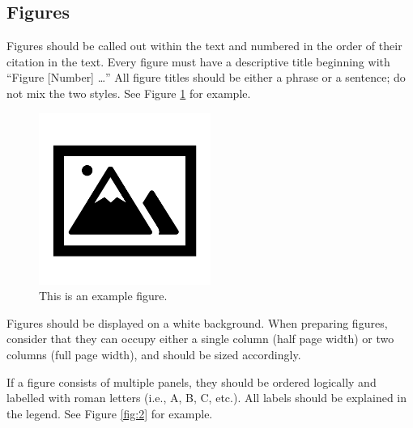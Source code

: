 \documentclass{article}
\begin{document}
\subsection*{Figures}
Figures should be called out within the text and numbered in the order of their citation in the text. Every figure must have a descriptive title beginning with ``Figure [Number] …'' All figure titles should be either a phrase or a sentence; do not mix the two styles. See Figure \ref{fig:1} for example.
\begin{figure}[h]
    \centering
    \includegraphics[width=0.5\textwidth]{fig 1}
    \caption{This is an example figure.}
    \label{fig:1}
\end{figure}

Figures should be displayed on a white background. When preparing figures, consider that they can occupy either a single column (half page width) or two columns (full page width), and should be sized accordingly.

If a figure consists of multiple panels, they should be ordered logically and labelled with roman letters (i.e., A, B, C, etc.). All labels should be explained in the legend. See Figure \ref{fig:2} for example.
\end{document}
